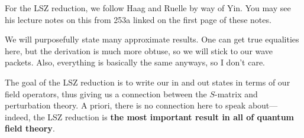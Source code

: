 \documentclass[11pt]{article}
\begin{document}
\begin{reemark}
    For the LSZ reduction, we follow Haag and Ruelle by way of Yin.
    You may see his lecture notes on this from 253a linked on the
    first page of these notes.

    We will purposefully state many approximate results. One can get true equalities
    here, but the derivation is much more obtuse, so we will stick to our wave
    packets. Also, everything is basically the same anyways, so I don't care.
\end{reemark}

The goal of the LSZ reduction is to write our in and out
states in terms of our field operators, thus giving us a
connection between the $S$-matrix and perturbation theory.
A priori, there is no connection here to speak about---indeed, 
the LSZ reduction is \textbf{the most important
result in all of quantum field theory}.
\end{document}
